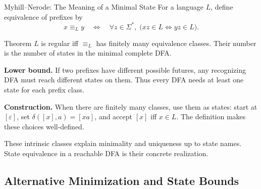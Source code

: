\documentclass[10pt]{beamer}
\begin{document}
\begin{frame}{Myhill--Nerode: The Meaning of a Minimal State}
  \small
  For a language $L$, define equivalence of prefixes by
  \[
    x\equiv_L y\quad\Longleftrightarrow\quad
    \forall z\in\Sigma^*,\;\bigl(xz\in L\iff yz\in L\bigr).
  \]
  \begin{block}{Theorem}
    $L$ is regular iff $\equiv_L$ has finitely many equivalence classes.
    Their number is the number of states in the minimal complete DFA.
  \end{block}
  \pause
  \textbf{Lower bound.} If two prefixes have different possible futures,
  any recognizing DFA must reach different states on them. Thus every DFA
  needs at least one state for each prefix class.
  \pause
  \par\smallskip
  \textbf{Construction.} When there are finitely many classes, use them as
  states: start at $[\varepsilon]$, set $\delta([x],a)=[xa]$, and accept
  $[x]$ iff $x\in L$. The definition makes these choices well-defined.
  \par\smallskip
  These intrinsic classes explain minimality and uniqueness up to state
  names. State equivalence in a reachable DFA is their concrete realization.
\end{frame}

\subsection{Alternative Minimization and State Bounds}
\end{document}
